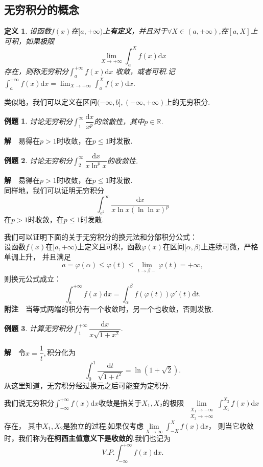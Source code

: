 \documentclass[UTF8]{article}
\newcommand{\dx}{\mathrm{d}x}
\newcommand{\jie}{\textbf{解}$\quad$}
\newcommand{\fz}{\textbf{附注}$\quad$}
\newtheorem{dfn}{\hspace{2em}定义}[section]
\newtheorem{exa}{\hspace{2em}例题}[section]
\begin{document}
\subsection{无穷积分的概念}
\begin{dfn}
  设函数$f(x)$在$[a,+\infty)$上\textbf{有定义}，并且对于$\forall X\in(a,+\infty)$,在$[a,X]$上可积，如果极限
  $$\lim_{X\to+\infty}\int_a^Xf(x)\dx$$存在，则称无穷积分$\displaystyle\int_a^{+\infty}f(x)\dx$
  收敛，或者可积.记$\displaystyle\int_a^{+\infty}f(x)\dx=\lim_{X\to+\infty}\displaystyle\int_a^Xf(x)\dx.$
\end{dfn}
类似地，我们可以定义在区间$(-\infty,b],(-\infty,+\infty)$上的无穷积分.
\begin{exa}
  讨论无穷积分$\displaystyle\int_1^\infty\dfrac{\dx}{x^p}$的敛散性，其中$p\in\mathbb{R}$.
\end{exa}
\jie 易得在$p>1$时收敛，在$p\le1$时发散.
\begin{exa}
  讨论无穷积分$\displaystyle\int_2^\infty\dfrac{\dx}{x\ln^px}$的收敛性.
\end{exa}
\jie 易得在$p>1$时收敛，在$p\le1$时发散.\\
同样地，我们可以证明无穷积分
$$\int_{e^2}^\infty\frac{\dx}{x\ln x(\ln\ln x)^p}$$在$p>1$时收敛，在$p\le1$时发散.

我们可以证明下面的关于无穷积分的换元法和分部积分公式：\\
设函数$f(x)$在$[a,+\infty)$上定义且可积，函数$\varphi(x)$在区间$[\alpha,\beta)$上连续可微，严格单调上升，
并且满足$$a=\varphi(\alpha)\le\varphi(t)\le\lim_{t\to\beta-}\varphi(t)=+\infty,$$则换元公式成立：
$$\int_a^{+\infty}f(x)\dx=\int_\alpha^\beta f(\varphi(t))\varphi'(t)\mathrm{d}t.$$
\fz 当等式两端的积分有一个收敛时，另一个也收敛，否则发散.
\begin{exa}
  计算无穷积分$\displaystyle\int_1^{+\infty}\dfrac{\dx}{x\sqrt{1+x^2}}.$
\end{exa}
\jie 令$x=\dfrac{1}{t},$积分化为
$$\int_0^1\frac{\mathrm{d}t}{\sqrt{1+t^2}}=\ln(1+\sqrt{2}).$$
从这里知道，无穷积分经过换元之后可能变为定积分.

我们说无穷积分$\displaystyle\int_{-\infty}^{+\infty}f(x)\dx$收敛是指关于$X_1,X_2$的极限
$\lim\limits_{\substack{X_1\to-\infty\\X_2\to+\infty}}\displaystyle\int_{X_1}^{X_2}f(x)\dx$存在，
其中$X_1,X_2$是独立的过程.如果仅考虑$\lim\limits_{X\to\infty}\displaystyle\int_{-X}^Xf(x)\dx$，
则当它收敛时，我们称为\textbf{在柯西主值意义下是收敛的}.我们也记为
$$V.P.\int_{-\infty}^{+\infty}f(x)\dx.$$
\end{document}
